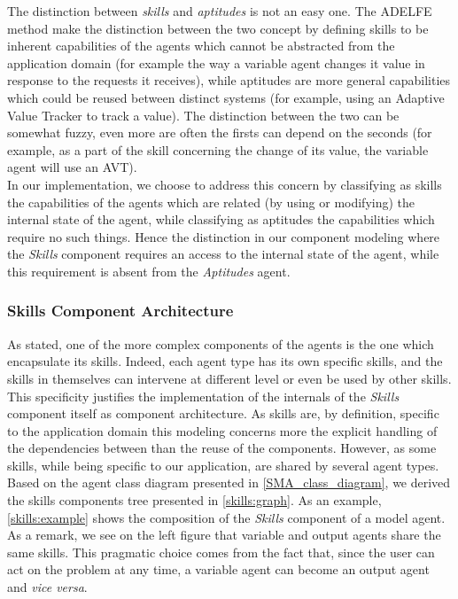 The distinction between \emph{skills} and \emph{aptitudes} is not an easy one. The ADELFE method make the distinction between the two concept by defining skills to be inherent capabilities of the agents which cannot be abstracted from the application domain (for example the way a variable agent 
changes it value in response to the requests it receives), while aptitudes are more general capabilities which could be reused between distinct systems (for example, using an Adaptive Value Tracker to track a value). The distinction between the two can be somewhat fuzzy, even more are often the firsts can depend on the seconds (for example, as a part of the skill concerning the change of its value, the variable agent will use an AVT).\\
In our implementation, we choose to address this concern by classifying as skills the capabilities of the agents which are related (by using or modifying) the internal state of the agent, while classifying as aptitudes the capabilities which require no such things. Hence the distinction in our component modeling where the \emph{Skills} component requires an access to the internal state of the agent, while this requirement is absent from the \emph{Aptitudes} agent.

\subsubsection{Skills Component Architecture}\label{Skills_component_descr}

As stated, one of the more complex components of the agents is the one which encapsulate its skills. Indeed, each agent type has its own specific skills, and the skills in themselves can intervene at different level or even be used by other skills. This specificity justifies the implementation of the internals of the \emph{Skills} component itself as component architecture. As skills are, by definition, specific to the application domain this modeling concerns more the explicit handling of the dependencies between  than the reuse of the components. However, as some skills, while being specific to our application, are shared by several agent types. Based on the agent class diagram presented in \figurename{} \ref{SMA_class_diagram}, we derived the skills components tree presented in \figurename{} \ref{skills:graph}. As an example, \figurename{} \ref{skills:example} shows the composition of the \emph{Skills} component of a model agent.  As a remark, we see on the left figure that variable and output agents share the same skills. This pragmatic choice comes from the fact that, since the user can act on the problem at any time, a variable agent can become an output agent and \emph{vice versa}.


